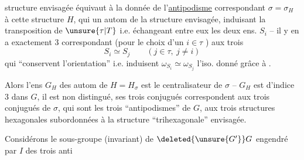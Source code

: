 structure envisagée équivaut à la donnée de l'\uline{antipodisme} correspondant $\sigma=\sigma_H$ à cette structure $H$, qui   un autom  de la structure envisagée, induisant la transposition de $\unsure{\tau|T}$ i.e. échangeant entre eux les deux ens. $S_i$
-- il y en a exactement $3$ correspondant (pour le choix d'un $i\in\tau$ ) aux trois 
\[
S_i\simeq S_j\qquad(j\in\tau,\ j\ne i)
\]
qui ``conservent l'orientation''\unsure{)} i.e. induisent $\omega_{S_i}\simeq\omega_{S_j}$ l'iso. donné grâce à . 

Alors l'ens $G_H$ des autom de $H=H_\sigma$ est le centralisateur de $\sigma$ -- $G_H$ est d'indice $3$ dans $G$, il est non distingué, ses trois conjugués correspondent aux trois conjugués de $\sigma$, qui sont les trois ``antipodismes'' de $G$,  aux trois structures hexagonales subordonnées à la structure ``trihexagonale'' envisagée.

Considérons le sous-groupe (invariant)  de $\deleted{\unsure{G'}}G$ engendré par  $I$ des trois anti%
